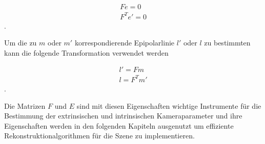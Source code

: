 \begin{gather}
	Fe = 0\\
	F^Te' = 0
\end{gather}.

Um die zu $m$ oder $m'$ korrespondierende Epipolarlinie $l'$ oder $l$ zu bestimmten kann die folgende Transformation verwendet werden\cite{HZ,phdTwoView,HZ8,ZZGXr,phdextrinsicPara}%

\begin{gather}
	l' = Fm\\
	l = F^Tm'
\end{gather}. 

Die Matrizen $F$ und $E$ sind mit diesen Eigenschaften wichtige Instrumente für die Bestimmung der extrinsischen und intrinsischen Kameraparameter und ihre Eigenschaften werden in den folgenden Kapiteln ausgenutzt um effiziente Rekonstruktionalgorithmen für die Szene zu implementieren. 




